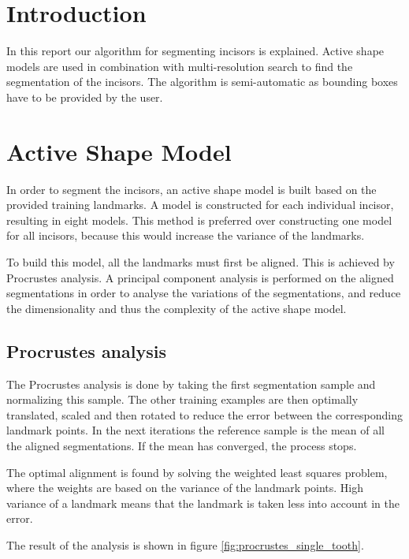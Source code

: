 \documentclass[a4paper,10pt]{article}
\begin{document}

\tableofcontents

\section{Introduction}
In this report our algorithm for segmenting incisors is explained. Active shape models are used in combination with multi-resolution search to find the segmentation of the incisors. The algorithm is semi-automatic as bounding boxes have to be provided by the user.

\section{Active Shape Model}
In order to segment the incisors, an active shape model is built based on the provided training landmarks. A model is constructed for each individual incisor, resulting in eight models. This method is preferred over constructing one model for all incisors, because this would increase the variance of the landmarks.

To build this model, all the landmarks must first be aligned. This is achieved by Procrustes analysis. A principal component analysis is performed on the aligned segmentations in order to analyse the variations of the segmentations, and reduce the dimensionality and thus the complexity of the active shape model.
\subsection{Procrustes analysis}
The Procrustes analysis is done by taking the first segmentation sample and normalizing this sample. The other training examples are then optimally translated, scaled and then rotated to reduce the error between the corresponding landmark points. In the next iterations the reference sample is the mean of all the aligned segmentations. If the mean has converged, the process stops.

The optimal alignment is found by solving the weighted least squares problem, where the weights are based on the variance of the landmark points. High variance of a landmark means that the landmark is taken less into account in the error.

The result of the analysis is shown in figure \ref{fig:procrustes_single_tooth}.
\end{document}
